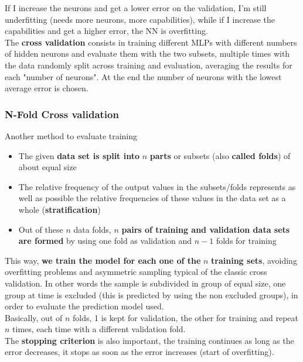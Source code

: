 \documentclass[11pt]{article}
\begin{document}
		If I increase the neurons and get a lower error on the validation, I'm still underfitting (needs more neurons, more capabilities), while if I increase the capabilities and get a higher error, the NN is overfitting.\\
		
		The \textbf{cross validation} consists in training different MLPs with different numbers of hidden neurons and evaluate them with the two subsets, multiple times with the data randomly split across training and evaluation, averaging the results for each "number of neurons". At the end the number of neurons with the lowest average error is chosen.\\
		
		\newpage
		
		\subsubsection{N-Fold Cross validation} 
		
		Another method to evaluate training
		\begin{itemize}
			\item The given \textbf{data set is split into} $n$ \textbf{parts} or subsets (also \textbf{called folds}) of about equal size
			\item The relative frequency of the output values in the subsets/folds represents as well as possible the relative frequencies of these values in the data set as a whole (\textbf{stratification})
			\item Out of these $n$ data folds, $n$ \textbf{pairs of training and validation data sets are formed} by using one fold as validation and $n-1$ folds for training
		\end{itemize}
		
		This way, \textbf{we train the model for each one of the} $n$ \textbf{training sets}, avoiding overfitting problems and asymmetric sampling typical of the classic cross validation. In other words the sample is subdivided in group of equal size, one group at time is excluded (this is predicted by using the non excluded groups), in order to evaluate the prediction model used. \\
		
		Basically, out of $n$ folds, 1 is kept for validation, the other for training and repeat $n$ times, each time with a different validation fold.\\
		
		The \textbf{stopping criterion} is also important, the training continues as long as the error decreases, it stops as soon as the error increases (start of overfitting).\\
		
\end{document}
